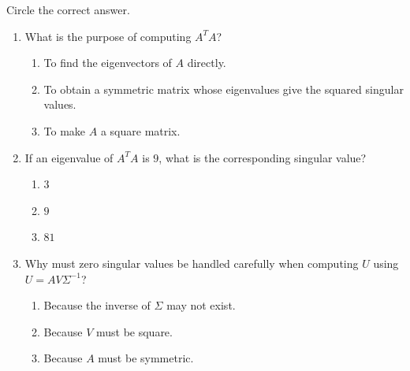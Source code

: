 \documentclass{ximera}
\begin{document}
\begin{exercise}
    Circle the correct answer.
    \begin{enumerate}
    \item What is the purpose of computing $A^T A$?

    \begin{enumerate}[label=(\alph*)]
        \item To find the eigenvectors of $A$ directly.
        \item To obtain a symmetric matrix whose eigenvalues
        give the squared singular values.
        \item To make $A$ a square matrix.
    \end{enumerate}

    \vspace{0.5cm}

    \item If an eigenvalue of $A^T A$ is $9$, what is the
    corresponding singular value?

    \begin{enumerate}[label=(\alph*)]
        \item $3$
        \item $9$
        \item $81$
    \end{enumerate}

    \item Why must zero singular values be handled carefully
    when computing $U$ using
    $U = AV\Sigma^{-1}$?

    \begin{enumerate}[label=(\alph*)]
        \item Because the inverse of $\Sigma$ may not exist.
        \item Because $V$ must be square.
        \item Because $A$ must be symmetric.
    \end{enumerate}

    \end{enumerate}
\end{exercise}
\end{document}
